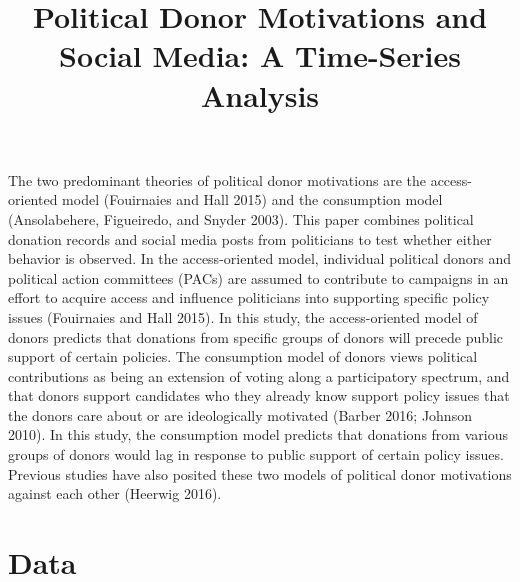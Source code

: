 \documentclass[12pt,]{article}
\title{Political Donor Motivations and Social Media: A Time-Series Analysis  }
\author{\Large \vspace{0.05in} \newline\normalsize\emph{}  }
\date{}
\newcommand*{\authorfont}{\fontfamily{phv}\selectfont}
\begin{document}
	
%

{%
\setlength{\parindent}{0pt}
\thispagestyle{plain}
{\fontsize{18}{20}\selectfont\raggedright 
\maketitle  %

}

{
   \vskip 13.5pt\relax \normalsize\fontsize{11}{12} 
\textbf{\authorfont } \hskip 15pt \emph{\small }   

}

}






\vskip -8.5pt



\noindent \doublespacing 

The two predominant theories of political donor motivations are the
access-oriented model (Fouirnaies and Hall 2015) and the consumption
model (Ansolabehere, Figueiredo, and Snyder 2003). This paper combines
political donation records and social media posts from politicians to
test whether either behavior is observed. In the access-oriented model,
individual political donors and political action committees (PACs) are
assumed to contribute to campaigns in an effort to acquire access and
influence politicians into supporting specific policy issues (Fouirnaies
and Hall 2015). In this study, the access-oriented model of donors
predicts that donations from specific groups of donors will precede
public support of certain policies. The consumption model of donors
views political contributions as being an extension of voting along a
participatory spectrum, and that donors support candidates who they
already know support policy issues that the donors care about or are
ideologically motivated (Barber 2016; Johnson 2010). In this study, the
consumption model predicts that donations from various groups of donors
would lag in response to public support of certain policy issues.
Previous studies have also posited these two models of political donor
motivations against each other (Heerwig 2016).

\hypertarget{data}{%
\section{Data}\label{data}}
\end{document}
